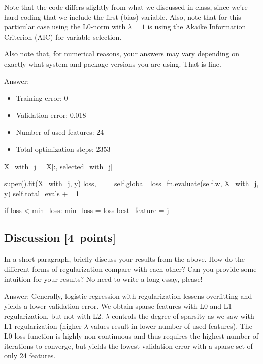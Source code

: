 \documentclass{article}
\newenvironment{answer}{\par\begingroup\color{gre}Answer: }{\endgroup}
\newcommand\pts[1]{\textcolor{pointscolour}{[#1~points]}}
\begin{document}
Note that the code differs slightly from what we discussed in class,
since we're hard-coding that we include the first (bias) variable.
Also, note that for this particular case using the L0-norm with $\lambda=1$
is using the Akaike Information Criterion (AIC) for variable selection.

Also note that, for numerical reasons, your answers may vary depending on exactly what system and package versions you are using. That is fine.

\begin{answer}
    \begin{itemize}
        \item Training error: 0
        \item Validation error: 0.018
        \item Number of used features: 24
        \item Total optimization steps: 2353
    \end{itemize}
\end{answer}

\begin{python}
X_with_j = X[:, selected_with_j]

super().fit(X_with_j, y)
loss, _ = self.global_loss_fn.evaluate(self.w, X_with_j, y)
self.total_evals += 1

if loss < min_loss:
    min_loss = loss
    best_feature = j
\end{python}


\subsection{Discussion \pts{4}}

In a short paragraph, briefly discuss your results from the above. How do the
different forms of regularization compare with each other?
Can you provide some intuition for your results? No need to write a long essay, please!

\begin{answer}
    Generally, logistic regression with regularization lessens overfitting and yields a lower validation error. We obtain sparse features with L0 and L1 regularization, but not with L2. $\lambda$ controls the degree of sparsity as we saw with L1 regularization (higher $\lambda$ values result in lower number of used features). The L0 loss function is highly non-continuous and thus requires the highest number of iterations to converge, but yields the lowest validation error with a sparse set of only 24 features.
\end{answer}
\end{document}
